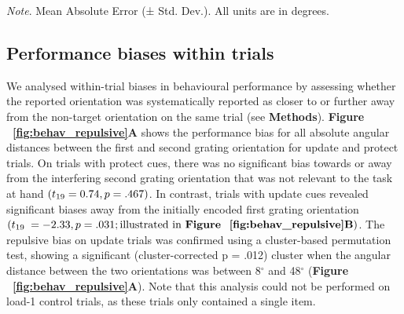 \documentclass{article}
\begin{document}
\begin{large}
\begin{table}[htpb]
\begin{center}
\small\textit{Note}. \fontsize{10}{12}\selectfont Mean Absolute Error (± Std. Dev.). All units are in degrees.
\end{center}
\label{table:error_rates}
\end{table}

\subsection{Performance biases within trials}
We analysed within-trial biases in behavioural performance by assessing whether the reported orientation was systematically reported as closer to or further away from the non-target orientation on the same trial (see \textbf{Methods}). \textbf{Figure ~\ref{fig:behav_repulsive}A} shows the performance bias for all absolute angular distances between the first and second grating orientation for update and protect trials. On trials with protect cues, there was no significant bias towards or away from the interfering second grating orientation that was not relevant to the task at hand $(t\textsubscript{19} = 0.74, p = .467)$. In contrast, trials with update cues revealed significant biases away from the initially encoded first grating orientation $(t\textsubscript{19 }= -2.33, p = .031; \text{illustrated in \textbf{Figure ~\ref{fig:behav_repulsive}B}})$. The repulsive bias on update trials was confirmed using a cluster-based permutation test, showing a significant (cluster-corrected p = .012) cluster when the angular distance between the two orientations was between 8$^{\circ}$ and 48$^{\circ}$ (\textbf{Figure ~\ref{fig:behav_repulsive}A}). Note that this analysis could not be performed on load-1 control trials, as these trials only contained a single item. \\


\end{large}
\end{document}
